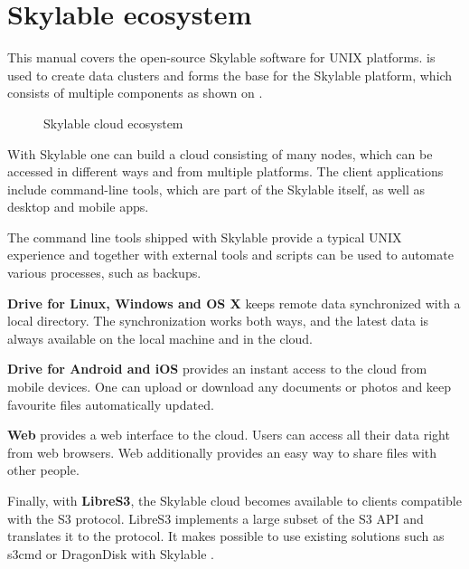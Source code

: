 \section{Skylable ecosystem}
This manual covers the open-source Skylable \SX software for UNIX platforms.
\SX is used to create data clusters and forms the base for the Skylable
platform, which consists of multiple components as shown on .
\begin{figure}
    \centering
    
    \caption{Skylable cloud ecosystem}
    \label{fig:components}
\end{figure}
With Skylable \SX one can build a cloud consisting of many nodes, which can
be accessed in different ways and from multiple platforms. The client
applications include command-line tools, which are part of the Skylable \SX
itself, as well as desktop and mobile apps.

The command line tools shipped with Skylable \SX provide a typical UNIX
experience and together with external tools and scripts can be used to
automate various processes, such as backups.

\textbf{\SX Drive for Linux, Windows and OS X} keeps remote data synchronized with
a local directory. The synchronization works both ways, and the latest data
is always available on the local machine and in the cloud.

\textbf{\SX Drive for Android and iOS} provides an instant access to the cloud from
mobile devices. One can upload or download any documents or photos and keep
favourite files automatically updated.

\textbf{\SX Web} provides a web interface to the cloud. Users can access all their
data right from web browsers. \SX Web additionally provides an easy way to
share files with other people.

Finally, with \textbf{LibreS3}, the Skylable cloud becomes available to clients
compatible with the S3 protocol. LibreS3 implements a large subset of the
S3 API and translates it to the \SX protocol. It makes possible to use
existing solutions such as s3cmd or DragonDisk with Skylable \SX.
